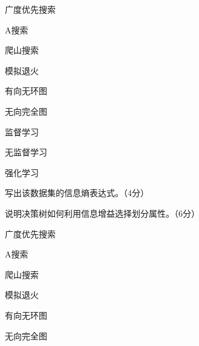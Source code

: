 \documentclass[flow]{neu-exam}
\begin{document}
\MakeExamTitle

\SingleChoice[每题3分，共6分]
\begin{choices}
  \item 广度优先搜索
  \item A\ExamStar 搜索
  \item 爬山搜索
  \item 模拟退火
\end{choices}
\begin{choices}
  \item 有向无环图
  \item 无向完全图
\end{choices}

\MultipleChoice[每题4分，共4分；至少有两个正确选项]
\begin{choices}
  \item 监督学习
  \item 无监督学习
  \item 强化学习
\end{choices}

\FillInBlank[每空2分，共4分]

\ShortAnswer[共6分]
\AnswerSpace[40bp]

\TrueFalse[每题2分，共4分]

\Comprehensive[共10分]
\begin{subquestions}
  \item 写出该数据集的信息熵表达式。（4分）
    \AnswerSpace[35bp]
  \item 说明决策树如何利用信息增益选择划分属性。（6分）
    \AnswerSpace[45bp]
\end{subquestions}

\SingleChoice[每题3分，共6分]
\begin{choices}
  \item 广度优先搜索
  \item A\ExamStar 搜索
  \item 爬山搜索
  \item 模拟退火
\end{choices}
\begin{choices}
  \item 有向无环图
  \item 无向完全图
\end{choices}
\end{document}
